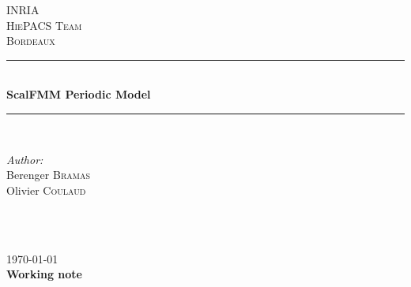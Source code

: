 \documentclass[12pt]{article} %
\begin{document}

\begin{titlepage}

\newcommand{\HRule}{\rule{\linewidth}{0.5mm}} %

\center %

\textsc{\LARGE INRIA}\\[1.5cm] %
\textsc{\Large HiePACS Team}\\[0.5cm] %
\textsc{\large Bordeaux}\\[0.5cm] %

\HRule \\[0.4cm]
{ \huge \bfseries ScalFMM Periodic Model}\\[0.4cm] %
\HRule \\[1.5cm]

\begin{minipage}{0.4\textwidth}
\begin{flushleft} \large
\emph{Author:}\\
Berenger \textsc{Bramas} \\%
Olivier \textsc{Coulaud} %

\end{flushleft}
\end{minipage}
~
\begin{minipage}{0.4\textwidth}
\begin{flushright} \large
\end{flushright}
\end{minipage}\\[4cm]

{\large \today}\\[1cm] %

{\Large \textbf{Working note}}
\vfill %

\end{titlepage}

\end{document}
